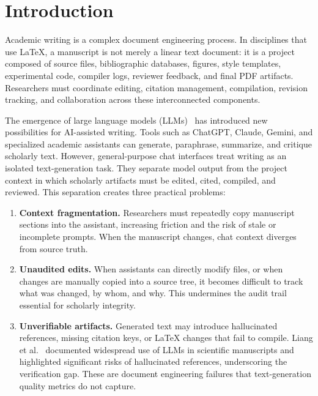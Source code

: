 \section{Introduction}

Academic writing is a complex document engineering process. In disciplines that
use \LaTeX{}, a manuscript is not merely a linear text document: it is a
project composed of source files, bibliographic databases, figures, style
templates, experimental code, compiler logs, reviewer feedback, and final PDF
artifacts. Researchers must coordinate editing, citation management, compilation,
revision tracking, and collaboration across these interconnected components.

The emergence of large language models (LLMs)~\cite{openai2023gpt4,
anthropic2024claude, openai2024gpt4o} has introduced new possibilities for
AI-assisted writing. Tools such as ChatGPT, Claude, Gemini, and specialized
academic assistants can generate, paraphrase, summarize, and critique scholarly
text. However, general-purpose chat interfaces treat writing as an isolated
text-generation task. They separate model output from the project context in
which scholarly artifacts must be edited, cited, compiled, and reviewed. This
separation creates three practical problems:

\begin{enumerate}
  \item \textbf{Context fragmentation.} Researchers must repeatedly copy
  manuscript sections into the assistant, increasing friction and the risk of
  stale or incomplete prompts. When the manuscript changes, chat context
  diverges from source truth.

  \item \textbf{Unaudited edits.} When assistants can directly modify files, or
  when changes are manually copied into a source tree, it becomes difficult to
  track what was changed, by whom, and why. This undermines the audit trail
  essential for scholarly integrity.

  \item \textbf{Unverifiable artifacts.} Generated text may introduce
  hallucinated references, missing citation keys, or \LaTeX{} changes that fail
  to compile. Liang et al.~\cite{liang2024llmwriting} documented widespread
  use of LLMs in scientific manuscripts and highlighted significant risks of
  hallucinated references, underscoring the verification gap. These
  are document engineering failures that text-generation quality metrics do not
  capture.
\end{enumerate}

